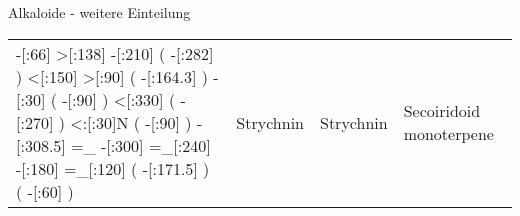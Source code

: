 \begin{frame}[t]{Alkaloide - weitere Einteilung}
\begin{table}[htpb]
\begin{tabular}{llll}
{            -[:66]%
           >[:138]%
           -[:210]%
                     (
               -[:282]\phantom{N}%
                     )
           <[:150]%
            >[:90]%
                     (
             -[:164.3]%
                     )
            -[:30]%
                     (
                -[:90]%
                     )
           <[:330]%
                     (
               -[:270]%
                     )
           <:[:30]N%
                     (
                -[:90]%
                     )
         -[:308.5]%
                =_%
           -[:300]%
          =_[:240]%
           -[:180]%
          =_[:120]%
                     (
             -[:171.5]%
                     )
                     (
                -[:60]%
                     )
       }  & Strychnin & Strychnin & Secoiridoid monoterpene \\
   
    \end{tabular}

  \end{table}
 


  \end{frame}



